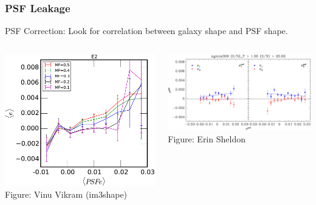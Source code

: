 \documentclass{beamer}
\begin{document}
\frame
{
    \frametitle{PSF Leakage}

    PSF Correction: Look for correlation between galaxy shape and PSF shape.

    \begin{columns}
        \begin{column}{0.38\textwidth}
            \begin{center}
                \includegraphics[width=\textwidth]{im3shape-PSF-E2.pdf}
                \newline
                {\tiny Figure: Vinu Vikram (im3shape)}
            \end{center}
        \end{column}
        \begin{column}{0.62\textwidth}
            \begin{center}
            \includegraphics[width=\textwidth]{ngmix009-e-vs-epsf-Ts2n-min-1-s2n-min-20.pdf}
                \newline
                {\tiny Figure: Erin Sheldon}
            \end{center}
        \end{column}
    \end{columns}
}
\end{document}
